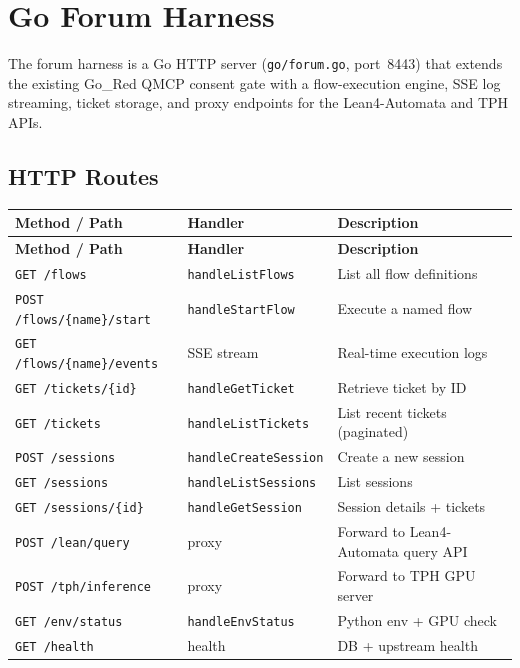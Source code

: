 
\section{Go Forum Harness}
\label{sec:forum-harness}

The forum harness is a Go HTTP server (\texttt{go/forum.go}, port~8443) that
extends the existing Go\_Red QMCP consent gate with a flow-execution engine,
SSE log streaming, ticket storage, and proxy endpoints for the Lean4-Automata
and TPH APIs.

\subsection{HTTP Routes}

\begin{longtable}{@{}llp{5cm}@{}}
\toprule
\textbf{Method / Path} & \textbf{Handler} & \textbf{Description} \\
\midrule
\endfirsthead
\toprule
\textbf{Method / Path} & \textbf{Handler} & \textbf{Description} \\
\midrule
\endhead
\bottomrule
\endfoot
\texttt{GET  /flows}              & \texttt{handleListFlows}    & List all flow definitions \\
\texttt{POST /flows/\{name\}/start} & \texttt{handleStartFlow}  & Execute a named flow \\
\texttt{GET  /flows/\{name\}/events}& SSE stream                & Real-time execution logs \\
\texttt{GET  /tickets/\{id\}}     & \texttt{handleGetTicket}    & Retrieve ticket by ID \\
\texttt{GET  /tickets}            & \texttt{handleListTickets}  & List recent tickets (paginated) \\
\texttt{POST /sessions}           & \texttt{handleCreateSession}& Create a new session \\
\texttt{GET  /sessions}           & \texttt{handleListSessions} & List sessions \\
\texttt{GET  /sessions/\{id\}}    & \texttt{handleGetSession}   & Session details + tickets \\
\texttt{POST /lean/query}         & proxy                       & Forward to Lean4-Automata query API \\
\texttt{POST /tph/inference}      & proxy                       & Forward to TPH GPU server \\
\texttt{GET  /env/status}         & \texttt{handleEnvStatus}    & Python env + GPU check \\
\texttt{GET  /health}             & health                      & DB + upstream health \\
\end{longtable}

